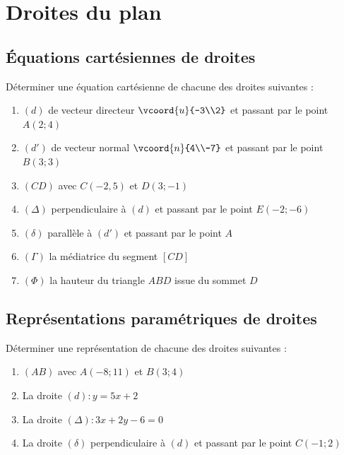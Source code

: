 \documentclass[oneside,12pt]{book}          %
\begin{document}
\section{Droites du plan}

\subsection{Équations cartésiennes de droites}
Déterminer une équation cartésienne de chacune des droites suivantes :
\begin{enumerate}
    \item $(d)$ de vecteur directeur $\vcoord{u}{-3\\2}$ et passant par le point $A(2;4)$
    \item $(d')$ de vecteur normal $\vcoord{n}{4\\-7}$ et passant par le point $B(3;3)$
    \item $(CD)$ avec $C(-2,5)$ et $D(3;-1)$
    \item $(\Delta)$ perpendiculaire à $(d)$ et passant par le point $E(-2;-6)$
    \item $(\delta)$ parallèle à $(d')$ et passant par le point $A$
    \item $(\Gamma)$ la médiatrice du segment $[CD]$
    \item $(\Phi)$ la hauteur du triangle $ABD$ issue du sommet $D$
\end{enumerate}



\subsection{Représentations paramétriques de droites}
Déterminer une représentation de chacune des droites suivantes :
\begin{enumerate}
	\item $(AB)$ avec $A(-8;11)$ et $B(3;4)$
	\item La droite $(d):y=5x+2$
	\item La droite $(\Delta):3x+2y-6=0$
	\item La droite $(\delta)$ perpendiculaire à $(d)$ et passant par le point $C(-1;2)$
\end{enumerate}
\end{document}
